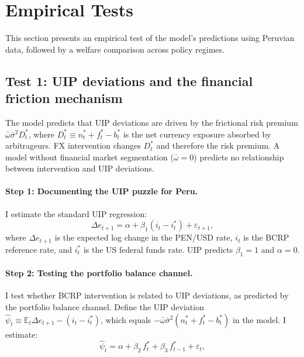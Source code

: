 \documentclass[12pt,a4paper]{article}
\begin{document}
\section{Empirical Tests}
\label{sec:tests}

This section presents an empirical test of the model's predictions using Peruvian data, followed by a welfare comparison across policy regimes.

\subsection{Test 1: UIP deviations and the financial friction mechanism}

The \cite{itskhokimukhin2025} model predicts that UIP deviations are driven by the frictional risk premium $\bar{\omega}\bar{\sigma}^2 D^*_t$, where $D^*_t \equiv n^*_t + f^*_t - b^*_t$ is the net currency exposure absorbed by arbitrageurs. FX intervention changes $D^*_t$ and therefore the risk premium. A model without financial market segmentation ($\bar{\omega} = 0$) predicts no relationship between intervention and UIP deviations.

\paragraph{Step 1: Documenting the UIP puzzle for Peru.} I estimate the standard UIP regression:
\begin{equation}
    \Delta e_{t+1} = \alpha + \beta_1 (i_t - i^*_t) + \varepsilon_{t+1},
    \label{eq:uip_classic}
\end{equation}
where $\Delta e_{t+1}$ is the expected log change in the PEN/USD rate, $i_t$ is the BCRP reference rate, and $i^*_t$ is the US federal funds rate. UIP predicts $\beta_1 = 1$ and $\alpha = 0$.

\paragraph{Step 2: Testing the portfolio balance channel.} I test whether BCRP intervention is related to UIP deviations, as predicted by the portfolio balance channel. Define the UIP deviation $\hat{\psi}_{t} \equiv \mathbb{E}_t \Delta e_{t+1} - (i_t - i^*_t)$, which equals $-\bar{\omega}\bar{\sigma}^2(n^*_t + f^*_t - b^*_t)$ in the model. I estimate:
\begin{equation}
    \hat{\psi}_{t} = \alpha + \beta_2\, f^*_{t} + \beta_3\, f^*_{t-1} + \varepsilon_{t},
    \label{eq:uip_fxi}
\end{equation}
\end{document}
